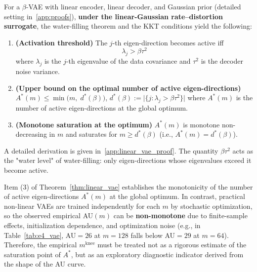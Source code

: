 \documentclass[make,article,submit,pdftex,moreauthors]{Definitions/mdpi}
\newcommand{\mknee}{m^{\mathrm{knee}}}
\begin{document}
\begin{Theorem}\label{thm:linear_vae}
For a $\beta$-VAE with linear encoder, linear decoder, and Gaussian prior
(detailed setting in~\ref{app:proofs}),
\textbf{under the linear-Gaussian rate--distortion surrogate},
the water-filling theorem and the KKT conditions yield the following:

\begin{enumerate}
  \item \textbf{(Activation threshold)} The $j$-th eigen-direction becomes active iff
        \begin{equation}
          \lambda_j > \beta \tau^2 \label{eq:au_threshold}
        \end{equation}
        where $\lambda_j$ is the $j$-th eigenvalue of the data covariance and
        $\tau^2$ is the decoder noise variance.
  \item \textbf{(Upper bound on the optimal number of active eigen-directions)}
        $A^*(m) \leq \min\bigl(m,\; d^*(\beta)\bigr)$,\quad
        $d^*(\beta) := \bigl|\{j : \lambda_j > \beta\tau^2\}\bigr|$
        \newline
        where $A^*(m)$ is the number of active eigen-directions at the global optimum.
  \item \textbf{(Monotone saturation at the optimum)}
        $A^*(m)$ is monotone non-decreasing in $m$ and saturates for
        $m \geq d^*(\beta)$ (i.e., $A^*(m) = d^*(\beta)$).
\end{enumerate}

\noindent
A detailed derivation is given in~\ref{app:linear_vae_proof}.
The quantity $\beta\tau^2$ acts as the "water level" of water-filling:
only eigen-directions whose eigenvalues exceed it become active.

\begin{Remark}
Item (3) of Theorem~\ref{thm:linear_vae} establishes the monotonicity of the number of
active eigen-directions $A^*(m)$ at the global optimum.
In contrast, practical non-linear VAEs are trained independently for each $m$ by
stochastic optimization, so the observed empirical AU$(m)$ can be
\textbf{non-monotone} due to finite-sample effects, initialization dependence, and
optimization noise
(e.g., in Table~\ref{tab:e4_vae}, AU$=26$ at $m=128$ falls below AU$=29$ at $m=64$).
Therefore, the empirical $\mknee$ must be treated not as a rigorous estimate of the
saturation point of $A^*$, but as an exploratory diagnostic indicator derived from the
shape of the AU curve.
\end{Remark}
\end{Theorem}
\end{document}
